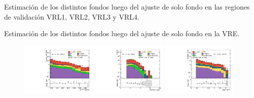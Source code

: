 \begin{table}[!ht]
  \centering
  \caption{Estimación de los distintos fondos luego del ajuste de solo fondo en las regiones de validación VRL1, VRL2, VRL3 y VRL4.}
  \resizebox{\textwidth}{!}{}
  \label{tab:bkgonly_result_vrl}
\end{table}

\begin{table}[!ht]
  \centering
  \caption{Estimación de los distintos fondos luego del ajuste de solo fondo en la VRE.}
  
  \label{tab:bkgonly_result_vre}
\end{table}

\begin{figure}[!ht]
  \centering

    \includegraphics[width=0.32\textwidth]{images/results/fr2_unblind/can_VRQ_ph_pt0_afterFit.pdf}
    \includegraphics[width=0.32\textwidth]{images/results/fr2_unblind/can_VRQ_jet_n_afterFit.pdf}
    \includegraphics[width=0.32\textwidth]{images/results/fr2_unblind/can_VRQ_dphi_jetmet_afterFit.pdf}


\end{figure}
